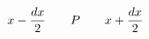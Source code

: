 \documentclass[preview]{standalone}
\begin{document}
\begin{align*}
\special{dvisvgm:raw <g id='unique000'>}x-\frac{dx}{2}\qquad P\qquad x+\frac{dx}{2}\special{dvisvgm:raw </g>}
\end{align*}
\end{document}
